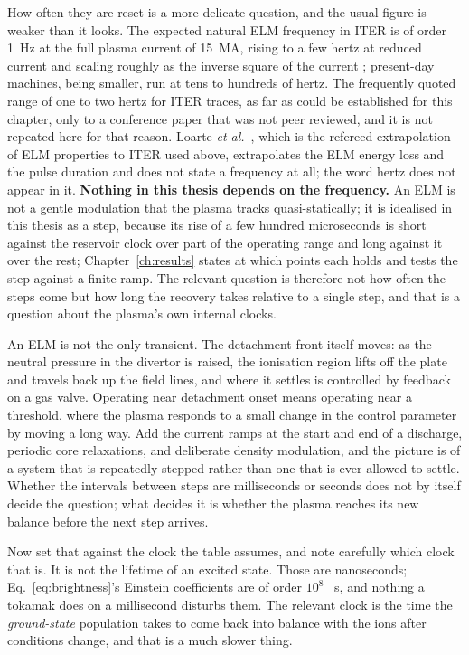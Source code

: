 How often they are reset is a more delicate question, and the usual figure is
weaker than it looks. The expected natural
ELM frequency in ITER is of order \SI{1}{\hertz} at the full plasma current of
\SI{15}{\mega\ampere}, rising to a few hertz at reduced current and scaling
roughly as the inverse square of the current \cite{Kirk2013}; present-day
machines, being smaller, run at tens to hundreds of hertz. The frequently quoted
range of one to two hertz for ITER traces, as far as could be established for
this chapter, only to a conference paper that was not peer reviewed, and it is
not repeated here for that reason. Loarte \emph{et al.}~\cite{Loarte2003},
which is the refereed extrapolation of ELM properties to ITER used above,
extrapolates the ELM energy loss and the pulse duration and does not state a
frequency at all; the word hertz does not appear in it. \textbf{Nothing in this
thesis depends on the frequency.} An ELM is not a gentle modulation that the
plasma tracks quasi-statically; it is idealised in this thesis as a step, because its rise of a few hundred
microseconds is short against the reservoir clock over part of the operating
range and long against it over the rest; Chapter~\ref{ch:results} states at
which points each holds and tests the step against a finite ramp. The relevant question is
therefore not how often the steps come but how long the recovery takes relative
to a single step, and that is a question about the plasma's own internal clocks.

An ELM is not the only transient. The detachment front itself moves: as the
neutral pressure in the divertor is raised, the ionisation region lifts off the
plate and travels back up the field lines, and where it settles is controlled by
feedback on a gas valve. Operating near detachment onset means operating near a
threshold, where the plasma responds to a small change in the control parameter
by moving a long way. Add the current ramps at the start and end of a discharge,
periodic core relaxations, and deliberate density modulation, and the picture is
of a system that is repeatedly stepped rather than one that is ever allowed to
settle. Whether the intervals between steps are milliseconds or seconds does not
by itself decide the question; what decides it is whether the plasma reaches its
new balance before the next step arrives.

Now set that against the clock the table assumes, and note carefully which clock
that is. It is not the lifetime of an excited state. Those are nanoseconds;
Eq.~\eqref{eq:brightness}'s Einstein coefficients are of order $10^{8}$
\si{\per\second}, and nothing a tokamak does on a millisecond disturbs them.
The relevant clock is the time the \emph{ground-state} population takes to come
back into balance with the ions after conditions change, and that is a much
slower thing.

